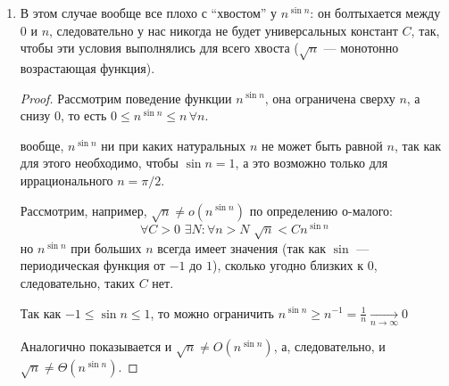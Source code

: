 \begin{enumerate}
\begin{itemize}
\begin{proof}
            Если $C>1$, то \eqref{eq:2} $\xrightarrow[n\to\infty]\infty$.

            Таким образом, $C^n\neq o(n^k) \Rightarrow n^k\neq\omega(C^n)$
        \end{proof}
        \begin{remark}
            $C^n = o(n^k)$ возможно в случае, когда $C\leq 1$, тогда $n^k=\omega(C^n)$
        \end{remark}
        \item $n^k \neq \Omega(C^n)$
        \begin{proof}
            $n^k = \Omega(C^n) \Leftrightarrow C^n = O(n^k)$. Аналогично предыдущему док-ву можно показать, что последнее неверно, следовательно, $n^k\neq\Omega(C^n)$.
        \end{proof}
        \item $n^k \neq \Theta(C^n)$
        \begin{proof}
            $n^k = \Theta(C^n) \Leftrightarrow n^k = O(C^n)$ и $C^n=O(n^k)$. Нарушение последнего уже показано в предыдущем случае, следовательно $n^k \neq \Theta(C^n)$
        \end{proof}
    \end{itemize}
    \item В этом случае вообще все плохо с ``хвостом'' у $n^{\sin n}$: он болтыхается между $0$ и $n$, следовательно у нас никогда не будет универсальных констант $C$, так, чтобы эти условия выполнялись для всего хвоста ($\sqrt{n}$ --- монотонно возрастающая функция).
    \begin{proof}
        Рассмотрим поведение функции $n^{\sin n}$, она ограничена сверху $n$, а снизу $0$, то есть $0 \leq n^{\sin n} \leq n \, \forall n$.
        \begin{remark}
            вообще, $n^{\sin n }$ ни при каких натуральных $n$ не может быть равной $n$, так как для этого необходимо, чтобы  $\sin n = 1$, а это возможно только для иррационального $n = \pi/2$.
        \end{remark}
        Рассмотрим, например, $\sqrt{n}\neq o(n^{\sin n})$ по определению о-малого: 
        \begin{equation}
            \forall C>0 \,\, \exists N:\forall n > N \,\, \sqrt{n} < Cn^{\sin n}
        \end{equation}
        но $n^{\sin n}$ при больших $n$ всегда имеет значения (так как $\sin$ --- периодическая функция от $-1$ до $1$), сколько угодно близких к $0$, следовательно, таких $C$ нет.
        \begin{remark}
            Так как $-1 \leq \sin n \leq 1$, то можно ограничить $n^{\sin n} \geq n^{-1} = \frac{1}{n} \xrightarrow[n\to\infty]{} 0$
        \end{remark}
        Аналогично показывается и $\sqrt{n}\neq O(n^{\sin n})$, а, следовательно, и $\sqrt{n}\neq \Theta(n^{\sin n})$.


\end{proof}
\end{enumerate}
